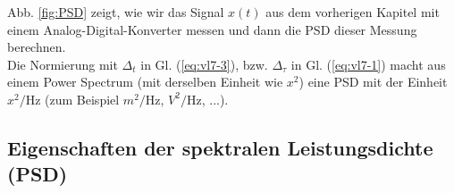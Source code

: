  

Abb. \ref{fig:PSD} zeigt, wie wir das Signal $x(t)$ aus dem vorherigen Kapitel mit einem Analog-Digital-Konverter messen und dann die PSD dieser Messung berechnen. \\ 

Die Normierung mit $\Delta_t$ in Gl. (\ref{eq:vl7-3}), bzw. $\Delta_\tau$ in Gl. (\ref{eq:vl7-1}) macht aus einem Power Spectrum (mit derselben Einheit wie $x^2$) eine PSD mit der Einheit $x^2/$Hz (zum Beispiel $m^2/$Hz, $V^2/$Hz, ...). 




\subsection{Eigenschaften der spektralen Leistungsdichte (PSD)}
\label{subsec:vl7-3}

